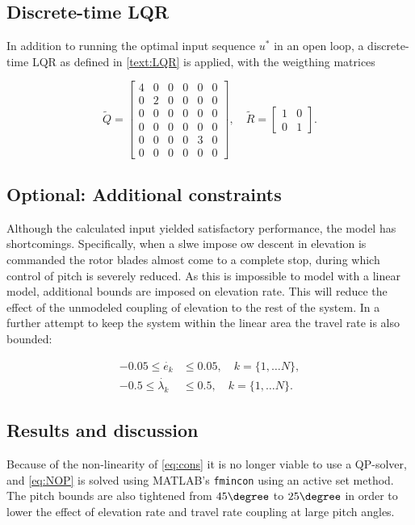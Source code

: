 \subsection{Discrete-time LQR}
In addition to running the optimal input sequence $u^*$ in an open loop, a discrete-time LQR as defined in \ref{text:LQR} is applied, with the weigthing matrices

\begin{equation}
\tilde{Q} = \begin{bmatrix}4&0&0&0&0&0\\0&2&0&0&0&0\\0&0&0&0&0&0\\0&0&0&0&0&0\\0&0&0&0&3&0\\0&0&0&0&0&0\end{bmatrix}, \quad \tilde{R} = \begin{bmatrix}1&0\\0&1\end{bmatrix}.
\end{equation}
\subsection{Optional: Additional constraints}
\label{text:additionalContraints}

Although the calculated input yielded satisfactory performance, the model has shortcomings. Specifically, when a slwe impose ow descent in elevation is commanded the rotor blades almost come to a complete stop, during which control of pitch is severely reduced. As this is impossible to model with a linear model, additional bounds are imposed on elevation rate. This will reduce the effect of the unmodeled coupling of elevation to the rest of the system. In a further attempt to keep the system within the linear area the travel rate is also bounded:

\begin{align*}
	-0.05 \le \dot{e_k} &\le 0.05, \quad k = \{1, \dots N\},\\
	-0.5 \le \dot{\lambda_k} &\le 0.5, \quad k = \{1, \dots N\}.
\end{align*}

\subsection{Results and discussion}
\label{text:problem4_results}
 Because of the non-linearity of \eqref{eq:cons} it is no longer viable to use a QP-solver, and \eqref{eq:NOP} is solved using MATLAB's \texttt{fmincon} using an active set method. The pitch bounds are also tightened from $45\degree$ to $25\degree$ in order to lower the effect of elevation rate and travel rate coupling at large pitch angles. 

